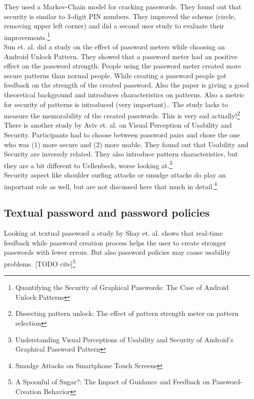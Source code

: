 \documentclass[twocolumn, a4paper, 10pt]{article}
\begin{document}
They used a Markov-Chain model for cracking passwords. They found out that security is similar to 3-digit PIN numbers. They improved the scheme (circle, removing upper left corner) and did a second user study to evaluate their improvements.\footnote{Quantifying the Security of Graphical Passwords: The Case of Android Unlock Patterns }\\

Sun et. al. did a study on the effect of password meters while choosing an Android Unlock Pattern. They showed that a password meter had an positive effect on the password strength. People using the password meter created more secure patterns than normal people. While creating a password people got feedback on the strength of the created password. Also the paper is giving a good theoretical background and introduces characteristics on patterns. Also a metric for security of patterns is introduced (very important).. The study lacks to measure the memorability of the created passwords. This is very sad actually!\footnote{Dissecting pattern unlock: The effect of pattern strength meter on pattern selection}\\

There is another study by Aviv et. al. on Visual Perception of Usability and Security. Participants had to choose between password pairs and chose the one who was (1) more secure and (2) more usable. They found out that Usability and Security are inversely related. They also introduce pattern characteristics, but they are a bit different to Uellenbeck, worse looking at.\footnote{Understanding Visual Perceptions of Usability and Security of Android's Graphical Password Pattern}\\

Security aspect like shoulder surfing attacks or smudge attacks do play an important role as well, but are not discussed here that much in detail.\footnote{Smudge Attacks on Smartphone Touch Screens}\\

\subsection{Textual password and password policies}
Looking at textual password a study by Shay et. al. shows that real-time feedback while password creation process helps the user to create stronger passwords with fewer errors. But also password policies may cause usability problems. [TODO cite]\footnote{A Spoonful of Sugar?: The Impact of Guidance and Feedback on Password-Creation Behavior}\\
\end{document}
